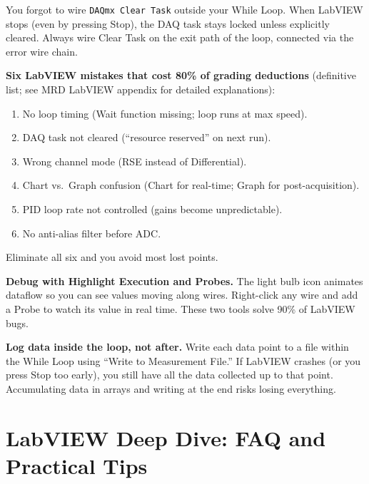 \documentclass[11pt,letterpaper]{article}
\begin{document}
\begin{faqbox}
You forgot to wire \texttt{DAQmx Clear Task} outside your While Loop. When LabVIEW stops (even by pressing Stop), the DAQ task stays locked unless explicitly cleared. Always wire Clear Task on the exit path of the loop, connected via the error wire chain.
\end{faqbox}

\begin{warnbox}
\textbf{Six LabVIEW mistakes that cost 80\% of grading deductions} (definitive list; see MRD LabVIEW appendix for detailed explanations):
\begin{enumerate}[nosep,leftmargin=*]
\item No loop timing (Wait function missing; loop runs at max speed).
\item DAQ task not cleared (``resource reserved'' on next run).
\item Wrong channel mode (RSE instead of Differential).
\item Chart vs.\ Graph confusion (Chart for real-time; Graph for post-acquisition).
\item PID loop rate not controlled (gains become unpredictable).
\item No anti-alias filter before ADC.
\end{enumerate}
Eliminate all six and you avoid most lost points.
\end{warnbox}

\begin{tipbox}
\textbf{Debug with Highlight Execution and Probes.} The light bulb icon animates dataflow so you can see values moving along wires. Right-click any wire and add a Probe to watch its value in real time. These two tools solve 90\% of LabVIEW bugs.
\end{tipbox}

\begin{protip}
\textbf{Log data inside the loop, not after.} Write each data point to a file within the While Loop using ``Write to Measurement File.'' If LabVIEW crashes (or you press Stop too early), you still have all the data collected up to that point. Accumulating data in arrays and writing at the end risks losing everything.
\end{protip}

\section{LabVIEW Deep Dive: FAQ and Practical Tips}
\end{document}
